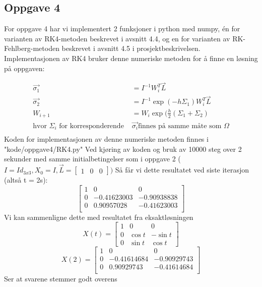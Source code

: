 \subsection{Oppgave 4}

For oppgave 4 har vi implementert 2 funksjoner i python med numpy, én for varianten av RK4-metoden beskrevet i avsnitt 4.4, og en for varianten av RK-Fehlberg-metoden beskrevet i avsnitt 4.5 i prosjektbeskrivelsen.\newline \newline
Implementasjonen av RK4 bruker denne numeriske metoden for å finne en løsning på oppgaven: \newline

$$
\begin{aligned}
\vec{\sigma_1} &= I^{-1}W_i^T \vec{L} \\
\vec{\sigma_2} &= I^{-1}\exp{(-h\Sigma_1)}W_i^T \vec{L} \\
W_{i+1} &= W_i \exp{(\frac{h}{2}(\Sigma_1 + \Sigma_2)} \\
\text{hvor } \Sigma_i \text{ for korresponderende }& \vec{\sigma_i} \text{finnes på samme måte som } \Omega \\
\end{aligned}
$$
Koden for implementasjonen av denne numeriske metoden finnes i "kode/oppgave4/RK4.py"\newline 
Ved kjøring av koden og bruk av 10000 steg over 2 sekunder med samme initialbetingelser som i oppgave 2 ($I=Id_{3x3}, X_0 = I, \vec{L} = \begin{bmatrix} 1 & 0 & 0\end{bmatrix})$ Så får vi dette resultatet ved siste iterasjon (altså t = 2s):\newline
$$
\begin{bmatrix}
1&0&0\\
0&-0.41623003&-0.90938838\\
0&0.90957028&-0.41623003\\
\end{bmatrix}
$$
Vi kan sammenligne dette med resultatet fra eksaktløsningen \newline
$$
    X(t)=\begin{bmatrix}1&0&0\\0&\cos t&-\sin t\\0&\sin t&\cos t\end{bmatrix}
$$
$$
    X(2) =     
    \begin{bmatrix}
    1 & 0 & 0\\
    0 & -0.41614684 & -0.90929743\\
    0 & 0.90929743 & -0.41614684\\
    \end{bmatrix}
$$ \newline Ser at svarene stemmer godt overens \newline \newline
